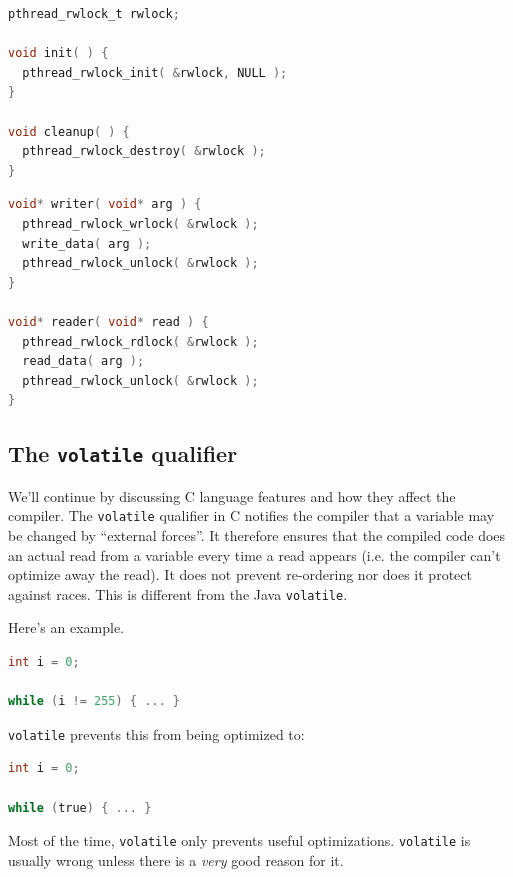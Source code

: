 \documentclass[a4paper]{report}
\begin{document}
\begin{multicols}{2}
\begin{lstlisting}[language=C]
pthread_rwlock_t rwlock;

void init( ) {
  pthread_rwlock_init( &rwlock, NULL );
}

void cleanup( ) {
  pthread_rwlock_destroy( &rwlock );
}
\end{lstlisting}

\columnbreak

\begin{lstlisting}[language=C]
void* writer( void* arg ) {
  pthread_rwlock_wrlock( &rwlock );
  write_data( arg );
  pthread_rwlock_unlock( &rwlock );
}

void* reader( void* read ) {
  pthread_rwlock_rdlock( &rwlock );
  read_data( arg );
  pthread_rwlock_unlock( &rwlock );
}
\end{lstlisting}

\end{multicols}



\subsection*{The {\tt volatile} qualifier}
We'll continue by discussing C language features and how they affect
the compiler. The {\tt volatile} qualifier in C notifies the compiler that
a variable may be changed by ``external forces''. It therefore ensures
that the compiled code does an actual read from a variable every time
a read appears (i.e. the compiler can't optimize away the read). It
does not prevent re-ordering nor does it protect against races. This is different from the Java {\tt volatile}.

Here's an example.
  \begin{lstlisting}[language=C]
int i = 0;

while (i != 255) { ... }
  \end{lstlisting}

{\tt volatile} prevents this from being optimized to:

  \begin{lstlisting}[language=C]
int i = 0;

while (true) { ... }
  \end{lstlisting}

Most of the time, {\tt volatile} only prevents useful
optimizations. {\tt volatile} is usually wrong unless there is a
\emph{very} good reason for it.
\end{document}
